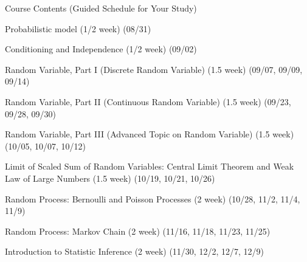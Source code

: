 \begin{frame}{Course Contents (Guided Schedule for Your Study)}

\plitemsep 0.02in


\small
\bce[1.] 

\item Probabilistic model (1/2 week) (08/31)

\item Conditioning and Independence (1/2 week) (09/02)

\item Random Variable, Part I (Discrete Random Variable) (1.5 week)
  (09/07, 09/09, 09/14)

\item[]  \hrulefill

\item Random Variable, Part II (Continuous Random Variable) (1.5 week)
  (09/23, 09/28, 09/30) 

\item Random Variable, Part III (Advanced Topic on Random Variable)
  (1.5 week) (10/05, 10/07, 10/12)

\item[]  \hrulefill

\item Limit of Scaled Sum of Random Variables: Central Limit Theorem
  and Weak Law of Large Numbers (1.5 week) (10/19, 10/21, 10/26)

\item Random Process: Bernoulli and Poisson Processes (2 week) (10/28,
  11/2, 11/4, 11/9)

\item[]  \hrulefill

\item Random Process: Markov Chain (2 week) (11/16, 11/18, 11/23, 11/25)

\item Introduction to Statistic Inference (2 week) (11/30, 12/2, 12/7,
  12/9)

\item[]  \hrulefill
  \ece

\end{frame}


